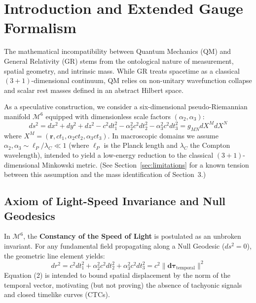 \documentclass[11pt,a4paper]{article}
\begin{document}
\section{Introduction and Extended Gauge Formalism}

The mathematical incompatibility between Quantum Mechanics (QM) and General Relativity (GR) stems from the ontological nature of measurement, spatial geometry, and intrinsic mass. While GR treats spacetime as a classical $(3+1)$-dimensional continuum, QM relies on non-unitary wavefunction collapse and scalar rest masses defined in an abstract Hilbert space.

As a speculative construction, we consider a six-dimensional pseudo-Riemannian manifold $\mathcal{M}^6$ equipped with dimensionless scale factors $(\alpha_2, \alpha_3)$:
\begin{equation}
ds^2 = dx^2 + dy^2 + dz^2 - c^2 dt_1^2 - \alpha_2^2 c^2 dt_2^2 - \alpha_3^2 c^2 dt_3^2 = g_{MN} dX^M dX^N
\end{equation}
where $X^M = (\mathbf{r}, c t_1, \alpha_2 c t_2, \alpha_3 c t_3)$. In macroscopic domains we assume $\alpha_2, \alpha_3 \sim \ell_P / \lambda_C \ll 1$ (where $\ell_P$ is the Planck length and $\lambda_C$ the Compton wavelength), intended to yield a low-energy reduction to the classical $(3+1)$-dimensional Minkowski metric. (See Section~\ref{sec:limitations} for a known tension between this assumption and the mass identification of Section~3.)

\subsection{Axiom of Light-Speed Invariance and Null Geodesics}
In $\mathcal{M}^6$, the \textbf{Constancy of the Speed of Light} is postulated as an unbroken invariant. For any fundamental field propagating along a Null Geodesic ($ds^2 = 0$), the geometric line element yields:
\begin{equation}
dr^2 = c^2 dt_1^2 + \alpha_2^2 c^2 dt_2^2 + \alpha_3^2 c^2 dt_3^2 = c^2 \|\mathbf{d\tau}_{\text{temporal}}\|^2
\end{equation}
Equation (2) is intended to bound spatial displacement by the norm of the temporal vector, motivating (but not proving) the absence of tachyonic signals and closed timelike curves (CTCs).
\end{document}
